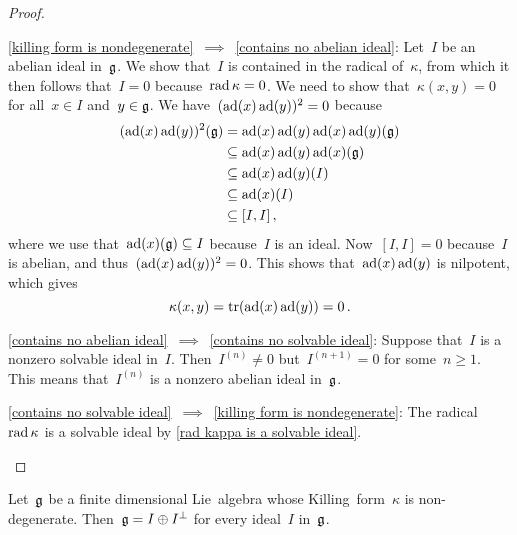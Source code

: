 \begin{proof}
  \leavevmode
  \begin{implicationlist}
    \item[\ref*{killing form is nondegenerate}~$\implies$~\ref*{contains no abelian ideal}:]
      Let~$I$ be an abelian ideal in~$\mathfrak{g}$.
      We show that~$I$ is contained in the radical of~$\kappa$, from which it then follows that~$I = 0$ because~$\operatorname{rad} \kappa = 0$.
      We need to show that~$\kappa(x,y) = 0$ for all~$x \in I$ and~$y \in \mathfrak{g}$.
      We have~$(\operatorname{ad}(x) \operatorname{ad}(y))^2 = 0$ because
      \begin{align*}
        (\operatorname{ad}(x) \operatorname{ad}(y))^2(\mathfrak{g})
        &=
        \operatorname{ad}(x)\operatorname{ad}(y)\operatorname{ad}(x)\operatorname{ad}(y)(\mathfrak{g})
        \\
        &\subseteq
        \operatorname{ad}(x)\operatorname{ad}(y)\operatorname{ad}(x)(\mathfrak{g})
        \\
        &\subseteq
        \operatorname{ad}(x)\operatorname{ad}(y)(I)
        \\
        &\subseteq
        \operatorname{ad}(x)(I)
        \\
        &\subseteq
        [I,I] \,,
      \end{align*}
      where we use that~$\operatorname{ad}(x)(\mathfrak{g}) \subseteq I$ because~$I$ is an ideal.
      Now~$[I,I] = 0$ because~$I$ is abelian, and thus~$(\operatorname{ad}(x)\operatorname{ad}(y))^2 = 0$.
      This shows that~$\operatorname{ad}(x)\operatorname{ad}(y)$ is nilpotent, which gives
      \[
        \kappa(x,y)
        =
        \operatorname{tr}(\operatorname{ad}(x) \operatorname{ad}(y))
        =
        0 \,.
      \]
    \item[\ref*{contains no abelian ideal}~$\implies$~\ref*{contains no solvable ideal}:]
      Suppose that~$I$ is a nonzero solvable ideal in~$I$.
      Then~$I^{(n)} \neq 0$ but~$I^{(n+1)} = 0$ for some~$n \geq 1$.
      This means that~$I^{(n)}$ is a nonzero abelian ideal in~$\mathfrak{g}$.
    \item[\ref*{contains no solvable ideal}~$\implies$~\ref*{killing form is nondegenerate}:]
      The radical~$\operatorname{rad} \kappa$ is a solvable ideal by \cref{rad kappa is a solvable ideal}.
    \qedhere
  \end{implicationlist}
\end{proof}


\begin{corollary}
  \label{decomposition into orthogonals for semisimple}
  Let~$\mathfrak{g}$ be a finite dimensional Lie~algebra whose Killing~form~$\kappa$ is non-degenerate.
  Then~$\mathfrak{g} = I \oplus I^\perp$ for every ideal~$I$ in~$\mathfrak{g}$.
\end{corollary}


